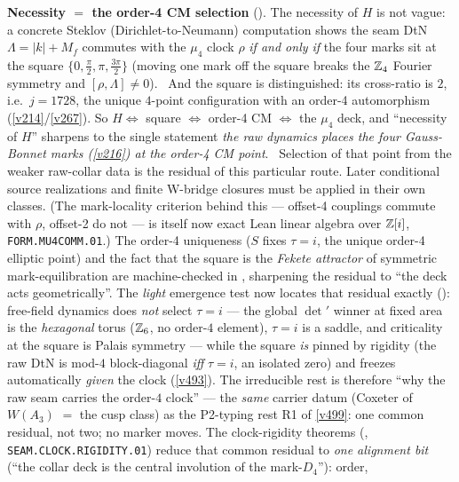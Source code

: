 \par\smallskip\noindent\textbf{Necessity $=$ the order-4 CM selection}
(). The necessity of $H$ is not vague: a concrete Steklov (Dirichlet-to-Neumann)
computation shows the seam DtN $\Lambda{=}|k|{+}M_f$ commutes with the $\mu_4$ clock $\rho$ \emph{if and only if}
the four marks sit at the square $\{0,\tfrac\pi2,\pi,\tfrac{3\pi}2\}$ (moving one mark off the square breaks the
$\mathbb Z_4$ Fourier symmetry and $[\rho,\Lambda]\neq0$). \mE\ And the square is distinguished: its cross-ratio is $2$,
i.e.\ $j{=}1728$, the unique $4$-point configuration with an order-4 automorphism (\vref{v214}/\vref{v267}). So
$H\Leftrightarrow$ square $\Leftrightarrow$ order-4 CM $\Leftrightarrow$ the $\mu_4$ deck, and ``necessity of $H$''
sharpens to the single statement \emph{the raw dynamics places the four Gauss-Bonnet marks (\vref{v216}) at the
order-4 CM point}. \mO\ Selection of that point from the weaker raw-collar data is the residual of this
particular route. Later conditional source realizations and finite W-bridge
closures must be applied in their own classes. (The mark-locality criterion behind this --- offset-4 couplings commute with $\rho$, offset-2 do not ---
is itself now exact Lean linear algebra over $\mathbb Z[i]$, \texttt{FORM.MU4COMM.01}.) The order-4 uniqueness ($S$ fixes
$\tau{=}i$, the unique order-4 elliptic point) and the fact that the square is the \emph{Fekete attractor} of
symmetric mark-equilibration are machine-checked in , sharpening the residual to ``the
deck acts geometrically''. The \emph{light} emergence test now locates that residual exactly
(): free-field dynamics does \emph{not} select $\tau=i$ --- the global
$\det{}'$ winner at fixed area is the \emph{hexagonal} torus ($\mathbb Z_6$, no order-$4$ element), $\tau=i$ is a saddle,
and criticality at the square is Palais symmetry --- while the square \emph{is} pinned by rigidity (the raw DtN is
mod-$4$ block-diagonal \emph{iff} $\tau=i$, an isolated zero) and freezes automatically \emph{given} the clock
(\vref{v493}). The irreducible rest is therefore ``why the raw seam carries the order-$4$ clock'' --- the
\emph{same} carrier datum (Coxeter of $W(A_3)$ $=$ the cusp class) as the P2-typing rest R1 of \vref{v499}: one
common residual, not two; no marker moves. The clock-rigidity theorems
(, \texttt{SEAM.CLOCK.RIGIDITY.01}) reduce that common residual to
\emph{one alignment bit} (``the collar deck is the central involution of the mark-$D_4$''): order,
